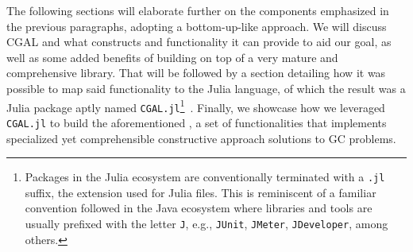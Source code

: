The following sections will elaborate further on the components emphasized in
the previous paragraphs, adopting a bottom-up-like approach.  We will discuss
\ac{CGAL} and what constructs and functionality it can provide to aid our goal,
as well as some added benefits of building on top of a very mature and
comprehensive library.  That will be followed by a section detailing how it was
possible to map said functionality to the Julia language, of which the result
was a Julia package aptly named \texttt{CGAL.jl}\footnote{Packages in the Julia
ecosystem are conventionally terminated with a \texttt{.jl} suffix, the
extension used for Julia files.  This is reminiscent of a familiar convention
followed in the Java ecosystem where libraries and tools are usually prefixed
with the letter \texttt{J}, e.g., \texttt{JUnit}, \texttt{JMeter},
\texttt{JDeveloper}, among others.}~\cite{Ventura:2021:CGAL.jl}.  Finally, we
showcase how we leveraged \texttt{CGAL.jl} to build the aforementioned
\primitives{}, a set of functionalities that implements specialized yet
comprehensible constructive approach solutions to \ac{GC} problems.




